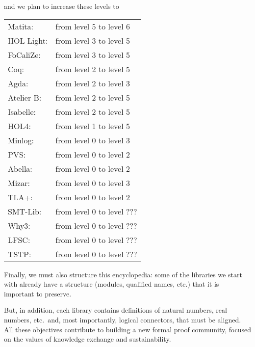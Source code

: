 and we plan to increase these levels to 

\begin{tabular}{ll}
Matita:& from level 5 to level 6\\
HOL Light:& from level 3 to level 5\\
FoCaliZe:& from level 3 to level 5\\
Coq:& from level 2 to level 5\\
Agda:& from level 2 to level 3\\
Atelier B:& from level 2 to level 5\\
Isabelle:& from level 2 to level 5\\
HOL4:& from level 1 to level 5\\
Minlog:& from level 0 to level 3\\
PVS:& from level 0 to level 2\\
Abella:& from level 0 to level 2\\
Mizar:& from level 0 to level 3\\
TLA+:& from level 0 to level 2\\
SMT-Lib:& from level 0 to level ???\\
Why3:& from level 0 to level ???\\
LFSC:& from level 0 to level ???\\
TSTP:& from level 0 to level ???\\
\end{tabular}

Finally, we must also structure this encyclopedia: some of the
libraries we start with already have a structure (modules, qualified
names, etc.) that it is important to preserve.

But, in addition, each library contains definitions of natural
numbers, real numbers, etc.\ and, most importantly, logical connectors,
that must be aligned.  All these objectives contribute to building a
new formal proof community, focused on the values of knowledge
exchange and sustainability.


